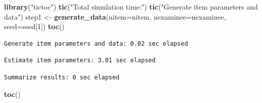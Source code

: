 \documentclass[
]{book}
\newenvironment{Shaded}{\begin{snugshade}}{\end{snugshade}}
\newcommand{\DataTypeTok}[1]{\textcolor[rgb]{0.13,0.29,0.53}{#1}}
\newcommand{\DecValTok}[1]{\textcolor[rgb]{0.00,0.00,0.81}{#1}}
\newcommand{\KeywordTok}[1]{\textcolor[rgb]{0.13,0.29,0.53}{\textbf{#1}}}
\newcommand{\NormalTok}[1]{#1}
\newcommand{\OperatorTok}[1]{\textcolor[rgb]{0.81,0.36,0.00}{\textbf{#1}}}
\newcommand{\StringTok}[1]{\textcolor[rgb]{0.31,0.60,0.02}{#1}}
\begin{document}
\begin{Shaded}
\begin{Highlighting}[]
\KeywordTok{library}\NormalTok{(}\StringTok{"tictoc"}\NormalTok{)}
\KeywordTok{tic}\NormalTok{(}\StringTok{"Total simulation time:"}\NormalTok{)}
\KeywordTok{tic}\NormalTok{(}\StringTok{"Generate item parameters and data"}\NormalTok{)}
\NormalTok{step1 <-}\StringTok{ }\KeywordTok{generate_data}\NormalTok{(}\DataTypeTok{nitem=}\NormalTok{nitem, }\DataTypeTok{nexaminee=}\NormalTok{nexaminee, }\DataTypeTok{seed=}\NormalTok{seed[}\DecValTok{1}\NormalTok{])}
\KeywordTok{toc}\NormalTok{()}
\end{Highlighting}
\end{Shaded}

\begin{verbatim}
Generate item parameters and data: 0.02 sec elapsed
\end{verbatim}

\begin{Shaded}
\end{Shaded}

\begin{verbatim}
Estimate item parameters: 3.01 sec elapsed
\end{verbatim}

\begin{Shaded}
\end{Shaded}

\begin{verbatim}
Summarize results: 0 sec elapsed
\end{verbatim}

\begin{Shaded}
\begin{Highlighting}[]
\KeywordTok{toc}\NormalTok{()}
\end{Highlighting}
\end{Shaded}
\end{document}
